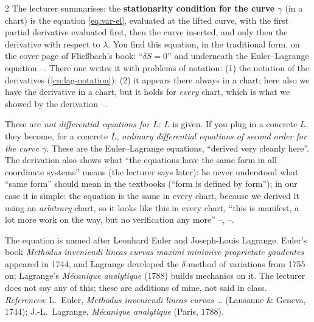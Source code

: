 \begin{paracol}{2}
The lecturer summarises: the \textbf{stationarity condition for the curve $\gamma$} (in a chart) is the equation \eqref{eq:var-el}, evaluated at the lifted curve, with the first partial derivative evaluated first, then the curve inserted, and only then the derivative with respect to $\lambda$. You find this equation, in the traditional form, on the cover page of Fließbach's book: ``$\delta S=0$'' and underneath the Euler--Lagrange equation --. There one writes it with problems of notation: (1) the notation of the derivatives (\cref{cn:lag-notation}); (2) it appears there always in a chart; here also we have the derivative in a chart, but it holds for \emph{every} chart, which is what we showed by the derivation --.

\begin{coursenote}\label{cn:var-ode}
These are \emph{not differential equations for $L$}: $L$ is given. If you plug in a concrete $L$, they become, for a concrete $L$, \emph{ordinary differential equations of second order for the curve $\gamma$}. These are the Euler--Lagrange equations, ``derived very cleanly here''. The derivation also shows what ``the equations have the same form in all coordinate systems'' means (the lecturer says later): he never understood what ``same form'' should mean in the textbooks (``form is defined by form''); in our case it is simple: the equation is the same in every chart, because we derived it using an \emph{arbitrary} chart, so it looks like this in every chart, ``this is manifest, a lot more work on the way, but no verification any more'' --, --.
\end{coursenote}

\begin{history}\label{hist:var-el}
The equation is named after Leonhard Euler and Joseph-Louis Lagrange. Euler's book \emph{Methodus inveniendi lineas curvas maximi minimive proprietate gaudentes} appeared in 1744, and Lagrange developed the $\delta$-method of variations from 1755 on; Lagrange's \emph{M\'ecanique analytique} (1788) builds mechanics on it. The lecturer does not say any of this; these are additions of mine, not said in class.\\
\emph{References}: L.\ Euler, \emph{Methodus inveniendi lineas curvas \dots} (Lausanne \& Geneva, 1744); J.-L.\ Lagrange, \emph{M\'ecanique analytique} (Paris, 1788).
\end{history}


\end{paracol}
